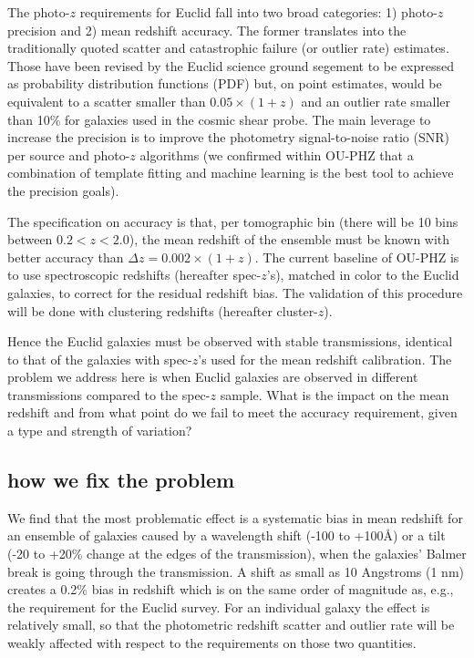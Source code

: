\documentclass[11pt]{article}
\begin{document}
The photo-\(z\) requirements for Euclid fall into two broad categories:
1) photo-\(z\) precision and 2) mean redshift accuracy. The former
translates into the traditionally quoted scatter and catastrophic
failure (or outlier rate) estimates. Those have been revised by the
Euclid science ground segement to be expressed as probability
distribution functions (PDF) but, on point estimates, would be
equivalent to a scatter smaller than \(0.05\times(1+z)\) and an outlier
rate smaller than 10\% for galaxies used in the cosmic shear probe. The
main leverage to increase the precision is to improve the photometry
signal-to-noise ratio (SNR) per source and photo-\(z\) algorithms (we
confirmed within OU-PHZ that a combination of template fitting and
machine learning is the best tool to achieve the precision goals).

The specification on accuracy is that, per tomographic bin (there will
be 10 bins between \(0.2 <z < 2.0\)), the mean redshift of the ensemble
must be known with better accuracy than \(\Delta z = 0.002\times(1+z)\).
The current baseline of OU-PHZ is to use spectroscopic redshifts
(hereafter spec-\(z\)'s), matched in color to the Euclid galaxies, to
correct for the residual redshift bias. The validation of this procedure
will be done with clustering redshifts (hereafter cluster-\(z\)).

Hence the Euclid galaxies must be observed with stable transmissions,
identical to that of the galaxies with spec-\(z\)'s used for the mean
redshift calibration. The problem we address here is when Euclid
galaxies are observed in different transmissions compared to the
spec-\(z\) sample. What is the impact on the mean redshift and from what
point do we fail to meet the accuracy requirement, given a type and
strength of variation?

\subsection{how we fix the problem}\label{how-we-fix-the-problem}

We find that the most problematic effect is a systematic bias in mean
redshift for an ensemble of galaxies caused by a wavelength shift (-100
to +100\AA{}) or a tilt (-20 to +20\% change at the edges of the
transmission), when the galaxies' Balmer break is going through the
transmission. A shift as small as 10 Angstroms (1 nm) creates a 0.2\%
bias in redshift which is on the same order of magnitude as, e.g., the
requirement for the Euclid survey. For an individual galaxy the effect
is relatively small, so that the photometric redshift scatter and
outlier rate will be weakly affected with respect to the requirements on
those two quantities.
\end{document}
